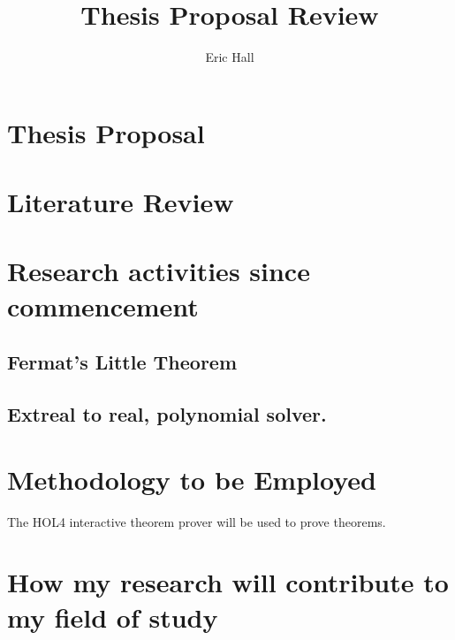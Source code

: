 \documentclass{article}
\title{Thesis Proposal Review}
\author{Eric Hall}
\begin{document}
\maketitle

\section{Thesis Proposal}

 	 

\section{Literature Review}

\section{Research activities since commencement}

\subsection {Fermat's Little Theorem}

\subsection {}

\subsection {Extreal to real, polynomial solver.}


\section{Methodology to be Employed}

The HOL4 interactive theorem prover will be used to prove theorems.

\section{How my research will contribute to my field of study}
\end{document}
